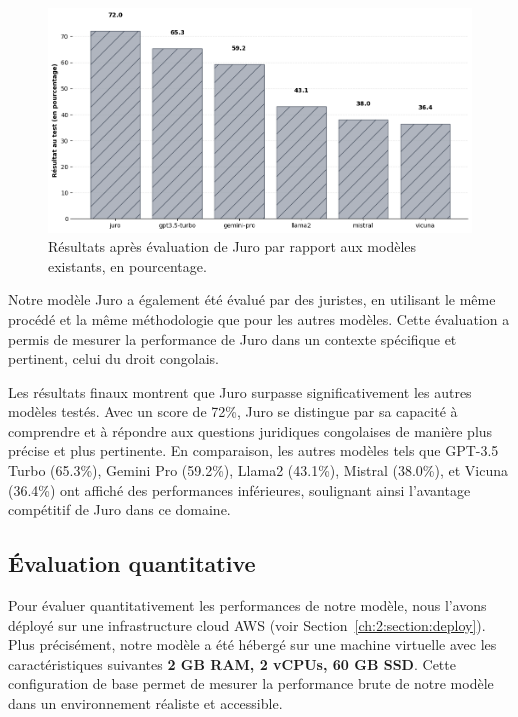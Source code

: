 \begin{figure}[H]
    \centering
    \includegraphics[width=15cm]{gfx/final-evaluation-juro.png}
    \caption{Résultats après évaluation de Juro par rapport aux modèles existants, en pourcentage.}
    \label{fig:final-evaluation-jur}
\end{figure}

Notre modèle Juro a également été évalué par des juristes, en utilisant le même procédé et la même méthodologie que pour les autres modèles. Cette évaluation a permis de mesurer la performance de Juro dans un contexte spécifique et pertinent, celui du droit congolais.

Les résultats finaux montrent que Juro surpasse significativement les autres modèles testés. Avec un score de 72\%, Juro se distingue par sa capacité à comprendre et à répondre aux questions juridiques congolaises de manière plus précise et plus pertinente. En comparaison, les autres modèles tels que GPT-3.5 Turbo (65.3\%), Gemini Pro (59.2\%), Llama2 (43.1\%), Mistral (38.0\%), et Vicuna (36.4\%) ont affiché des performances inférieures, soulignant ainsi l'avantage compétitif de Juro dans ce domaine.

\newpage
\subsection{Évaluation quantitative}

Pour évaluer quantitativement les performances de notre modèle, nous l'avons déployé sur une infrastructure cloud AWS (voir Section~\ref{ch:2:section:deploy}). Plus précisément, notre modèle a été hébergé sur une machine virtuelle avec les caractéristiques suivantes \textbf{2 GB RAM, 2 vCPUs, 60 GB SSD}. Cette configuration de base permet de mesurer la performance brute de notre modèle dans un environnement réaliste et accessible.

